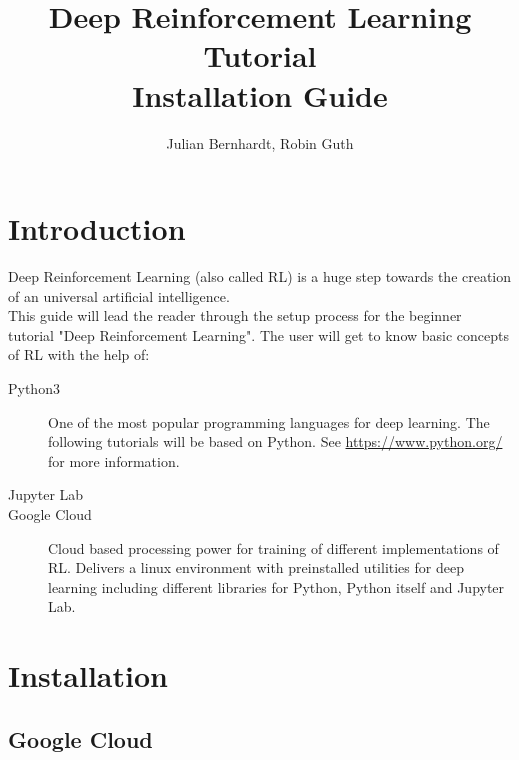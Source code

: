 \documentclass[]{article}
\title{Deep Reinforcement Learning Tutorial \\Installation Guide}
\author{Julian Bernhardt, Robin Guth}
\begin{document}
\maketitle
\tableofcontents

\section{Introduction}
Deep Reinforcement Learning (also called RL) is a huge step towards the creation of an universal artificial intelligence.\\ %
This guide will lead the reader through the setup process for the beginner tutorial "Deep Reinforcement Learning". 
The user will get to know basic concepts of RL with the help of:
\begin{description}
	\item[Python3] One of the most popular programming languages for deep learning. The following tutorials will be based on Python. See \url{https://www.python.org/} for more information.
	\item[Jupyter Lab] 
	\item[Google Cloud] Cloud based processing power for training of different implementations of RL. Delivers a linux environment with preinstalled utilities for deep learning including different libraries for Python, Python itself and Jupyter Lab.
\end{description}  
\section{Installation}
\subsection{Google Cloud}
\subsection{}
\end{document}
